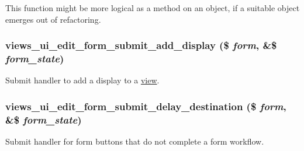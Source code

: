 This function might be more logical as a method on an object, if a suitable object emerges out of refactoring. \hypertarget{admin_8inc_a640f7e7b2468e31bdd95e808890c4849}{
\subsubsection[{views\_\-ui\_\-edit\_\-form\_\-submit\_\-add\_\-display}]{\setlength{\rightskip}{0pt plus 5cm}views\_\-ui\_\-edit\_\-form\_\-submit\_\-add\_\-display (\$ {\em form}, \/  \&\$ {\em form\_\-state})}}
\label{admin_8inc_a640f7e7b2468e31bdd95e808890c4849}
Submit handler to add a display to a \hyperlink{classview}{view}. \hypertarget{admin_8inc_a7f49b3c4b67b54e5bd82cbe7406f8eb4}{
\subsubsection[{views\_\-ui\_\-edit\_\-form\_\-submit\_\-delay\_\-destination}]{\setlength{\rightskip}{0pt plus 5cm}views\_\-ui\_\-edit\_\-form\_\-submit\_\-delay\_\-destination (\$ {\em form}, \/  \&\$ {\em form\_\-state})}}
\label{admin_8inc_a7f49b3c4b67b54e5bd82cbe7406f8eb4}
Submit handler for form buttons that do not complete a form workflow.

